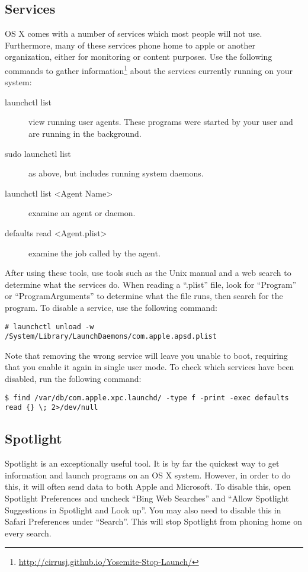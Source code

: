 			\subsection{Services}
				OS X comes with a number of services which most people will not use.
				Furthermore, many of these services phone home to apple or another organization, either for monitoring or content purposes.
				Use the following commands to gather information\footnote{\url{http://cirrusj.github.io/Yosemite-Stop-Launch/}} about the services currently running on your system:
				\begin{description}
					\item[launchctl list]
						view running user agents.
						These programs were started by your user and are running in the background.
					\item[sudo launchctl list]
						as above, but includes running system daemons.
					\item[launchctl list <Agent Name>]
						examine an agent or daemon.
					\item[defaults read <Agent.plist>]
						examine the job called by the agent.
				\end{description}
				After using these tools, use tools such as the Unix manual and a web search to determine what the services do.
				When reading a ``.plist'' file, look for ``Program'' or ``ProgramArguments'' to determine what the file runs, then search for the program.
				To disable a service, use the following command:
				\begin{lstlisting}[style=CLI]
					# launchctl unload -w /System/Library/LaunchDaemons/com.apple.apsd.plist
				\end{lstlisting}
				Note that removing the wrong service will leave you unable to boot, requiring that you enable it again in single user mode.
				To check which services have been disabled, run the following command:
				\begin{lstlisting}[style=CLI,gobble=5]
					$ find /var/db/com.apple.xpc.launchd/ -type f -print -exec defaults read {} \; 2>/dev/null
				\end{lstlisting}
			\subsection{Spotlight}
				Spotlight is an exceptionally useful tool.
				It is by far the quickest way to get information and launch programs on an OS X system.
				However, in order to do this, it will often send data to both Apple and Microsoft.
				To disable this, open Spotlight Preferences and uncheck ``Bing Web Searches'' and ``Allow Spotlight Suggestions in Spotlight and Look up''.
				You may also need to disable this in Safari Preferences under ``Search''.
				This will stop Spotlight from phoning home on every search.
